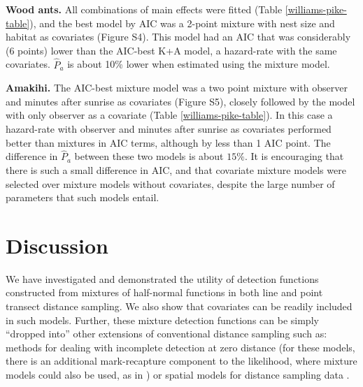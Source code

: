 \documentclass[10pt]{article}
\begin{document}
\textbf{Wood ants.} All combinations of main effects were fitted (Table \ref{williams-pike-table}), and the best model by AIC was a 2-point mixture with nest size and habitat as covariates (Figure S4). This model had an AIC that was considerably (6 points) lower than the AIC-best K+A model, a hazard-rate with the same covariates.  $\hat{P}_a$ is about 10\% lower when estimated using the mixture model.

\textbf{Amakihi.} The AIC-best mixture model was a two point mixture with observer and minutes after sunrise as covariates (Figure S5), closely followed by the model with only observer as a covariate (Table \ref{williams-pike-table}). In this case a hazard-rate with observer and minutes after sunrise as covariates performed better than mixtures in AIC terms, although by less than 1 AIC point. The difference in $\hat{P}_a$ between these two models is about $15\%$.  It is encouraging that there is such a small difference in AIC, and that covariate mixture models were selected over mixture models without covariates, despite the large number of parameters that such models entail.


\section*{Discussion}

We have investigated and demonstrated the utility of detection functions constructed from mixtures of half-normal functions in both line and point transect distance sampling. We also show that covariates can be readily included in such models. Further, these mixture detection functions can be simply ``dropped into'' other extensions of conventional distance sampling such as: methods for dealing with incomplete detection at zero distance \cite{Laake:2004tz, Laake:2011vm} (for these models, there is an additional mark-recapture component to the likelihood, where mixture models could also be used, as in \cite{Pledger:2000tc, Dorazio:2003uf, Pledger:2005wy, Morgan:2008wy}) or spatial models for distance sampling data \cite{Hedley:2004et, Miller:2013us}.
\end{document}
